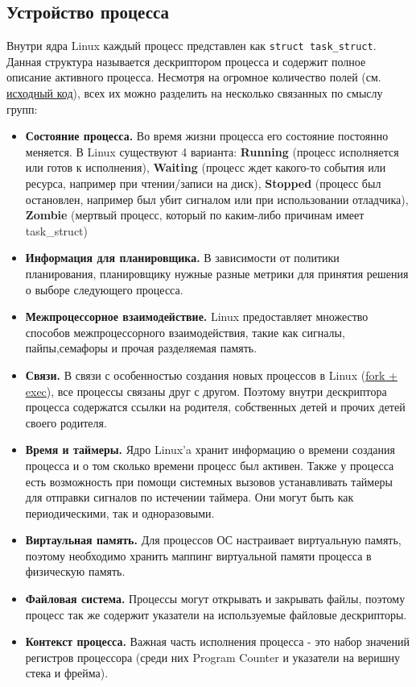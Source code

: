 \documentclass{article}
\begin{document}
\subsection{Устройство процесса}
Внутри ядра Linux каждый процесс представлен как \lstinline{struct task_struct}. Данная структура называется дескриптором процесса и содержит полное описание активного процесса. Несмотря на огромное количество полей (см. \href{https://github.com/torvalds/linux/blob/master/include/linux/sched.h}{исходный код}), всех их можно разделить на несколько связанных по смыслу групп:
\begin{itemize}
    \item \textbf{Состояние процесса.}
    Во время жизни процесса его состояние постоянно меняется. В Linux существуют 4 варианта: \textbf{Running} (процесс исполняется или готов к исполнения), \textbf{Waiting} (процесс ждет какого-то события или ресурса, например при чтении/записи на диск), \textbf{Stopped} (процесс был остановлен, например был убит сигналом или при использовании отладчика), \textbf{Zombie} (мертвый процесс, который по каким-либо причинам имеет task\_struct)
    \item \textbf{Информация для планировщика.}
    В зависимости от политики планирования, планировщику нужные разные метрики для принятия решения о выборе следующего процесса.
    \item \textbf{Межпроцессорное взаимодействие.}
    Linux предоставляет множество способов межпроцессорного взаимодействия, такие как сигналы, пайпы,семафоры и прочая разделяемая память.
    \item \textbf{Связи.}
    В связи с особенностью создания новых процессов в Linux (\href{https://en.wikipedia.org/wiki/Fork\%E2\%80\%93exec}{fork + exec}), все процессы связаны друг с другом. Поэтому внутри дескриптора процесса содержатся ссылки на родителя, собственных детей и прочих детей своего родителя.
    \item \textbf{Время и таймеры.}
    Ядро Linux'a хранит информацию о времени создания процесса и о том сколько времени процесс был активен. Также у процесса есть возможность при помощи системных вызовов устанавливать таймеры для отправки сигналов по истечении таймера. Они могут быть как периодическими, так и одноразовыми.
    \item \textbf{Виртаульная память.}
    Для процессов ОС настраивает виртуальную память, поэтому необходимо хранить маппинг виртуальной памяти процесса в физическую память.
    \item \textbf{Файловая система.}
    Процессы могут открывать и закрывать файлы, поэтому процесс так же содержит указатели на используемые файловые дескрипторы.
    \item \textbf{Контекст процесса.}
    Важная часть исполнения процесса - это набор значений регистров процессора (среди них Program Counter и указатели на веришну стека и фрейма).
\end{itemize}
\end{document}
